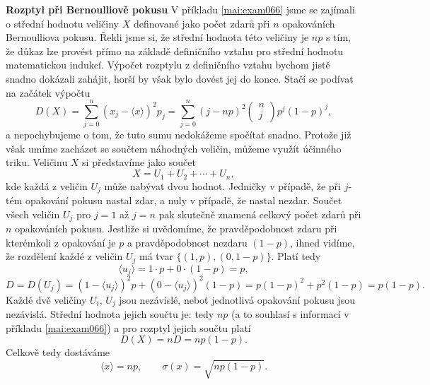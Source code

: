 \wikitextrule
\begin{example}\label{mai:exam072}
  \textbf{Rozptyl při Bernoulliově pokusu}\newline\small
  V příkladu \ref{mai:exam066} jsme se zajímali o střední hodnotu veličiny \(X\) definované jako 
  počet zdarů při \(n\) opakováních Bernoulliova pokusu. Řekli jsme si, že střední hodnota této 
  veličiny je \(np\) s tím, že důkaz lze provést přímo na základě definičního vztahu pro střední 
  hodnotu matematickou indukcí. Výpočet rozptylu z definičního vztahu bychom jistě snadno dokázali 
  zahájit, horší by však bylo dovést jej do konce. Stačí se podívat na začátek výpočtu
  \begin{equation*}
    D(X) = \sum_{j=0}^n \left(x_j - \langle x \rangle\right)^2p_j 
         = \sum_{j=0}^n \left(j - np\right)^2\begin{pmatrix}n\\ j \end{pmatrix}p^j(1 - p)^j,
  \end{equation*}
  a nepochybujeme o tom, že tuto sumu nedokážeme spočítat snadno. Protože již však umíme zacházet 
  se součtem náhodných veličin, můžeme využít účinného triku. Veličinu \(X\) si představíme jako 
  součet
  \begin{equation*}
    X = U_1 + U_2 + \cdots + U_n,
  \end{equation*}
  kde každá z veličin \(U_j\) může nabývat dvou hodnot. Jedničky v případě, že při \(j\)-tém 
  opakování pokusu nastal zdar, a nuly v případě, že nastal nezdar. Součet všech veličin \(U_j\) 
  pro \(j = 1\) až \(j = n\) pak skutečně znamená celkový počet zdarů při \(n\) opakováních pokusu. 
  Jestliže si uvědomíme, že pravděpodobnost zdaru při kterémkoli z opakování je \(p\) a 
  pravděpodobnost nezdaru \((1 - p)\), ihned vidíme, že rozdělení každé z veličin \(U_j\) má tvar
  \(\lbrace(1, p), (0, 1 - p)\rbrace\). Platí tedy
  \begin{equation*}
    \langle u_j\rangle = 1\cdot p + 0 \cdot (1 - p) = p,
  \end{equation*}
  \begin{equation*}
    D = D(U_j) = \left( 1 - \langle u_j\rangle\right)^2p 
               + \left( 0 - \langle u_j\rangle\right)^2(1 - p)
               = p(1 - p)^2 + p^2(1 - p) = p(1 - p).
  \end{equation*}
  Každé dvě veličiny \(U_i\), \(U_j\) jsou nezávislé, neboť jednotlivá opakování pokusu jsou 
  nezávislá. Střední hodnota jejich součtu je: tedy \(np\) (a to souhlasí s informací v příkladu 
  \ref{mai:exam066}) a pro rozptyl jejich součtu platí
  \begin{equation*}
    D(X) = nD = np(1 - p).
  \end{equation*}
  Celkově tedy dostáváme
  \begin{equation*}
    \langle x \rangle = np, \qquad \sigma(x) = \sqrt{np(1 - p)}.
  \end{equation*}
\normalsize
\end{example}